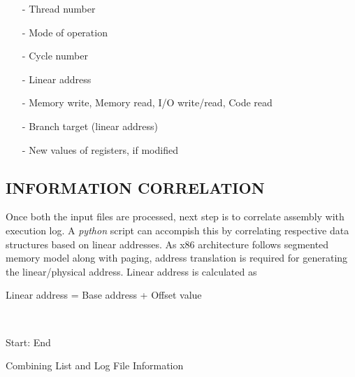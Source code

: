 
\begin{itemize}
 \item[-]  Thread number
 \item[-]  Mode of operation
 \item[-]  Cycle number
 \item[-]  Linear address
 \item[-]  Memory write, Memory read, I/O write/read, Code read
 \item[-]  Branch target (linear address)
 \item[-]  New values of registers, if modified
\end{itemize}


\subsection {INFORMATION CORRELATION}

Once both the input files are processed, next step is to correlate assembly with execution log. A {\it python} script can accompish this by correlating respective data structures based on linear addresses. As x86 architecture follows segmented memory model along with paging, address translation is required for generating the linear/physical address\cite{SS:AMD64-V2}. Linear address is calculated as
\\
\centerline{Linear address = Base address + Offset value}
\\



\IncMargin{1em}
\begin{algorithm}[h]
\DontPrintSemicolon
{} 

\BlankLine
Start: \;
End \;
\caption{Combining List and Log File Information}
\label{impl:algo:cllf}
\end{algorithm}\DecMargin{1em}


